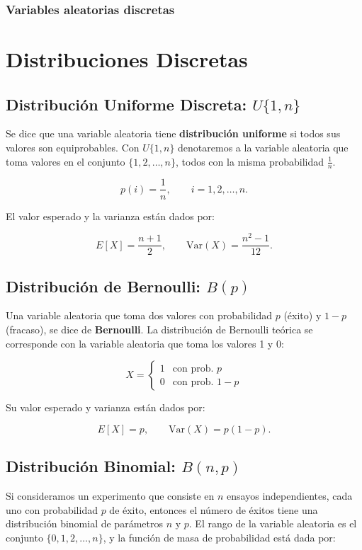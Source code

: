 \documentclass[11pt, a4paper]{article}
\theoremstyle{definition}
\begin{document}
\subsubsection{Variables aleatorias discretas}

\section*{Distribuciones Discretas}

\subsection*{Distribución Uniforme Discreta: $U\{1,n\}$}
Se dice que una variable aleatoria tiene \textbf{distribución uniforme} si todos sus valores son equiprobables. Con $U\{1,n\}$ denotaremos a la variable aleatoria que toma valores en el conjunto $\{1,2,\ldots,n\}$, todos con la misma probabilidad $\frac{1}{n}$.

\[p(i)=\frac{1}{n},\qquad i=1,2,\ldots,n.\]

El valor esperado y la varianza están dados por:

\[E[X]=\frac{n+1}{2},\qquad \text{Var}(X)=\frac{n^{2}-1}{12}.\]

\subsection*{Distribución de Bernoulli: $B(p)$}
Una variable aleatoria que toma dos valores con probabilidad $p$ (éxito) y $1-p$ (fracaso), se dice de \textbf{Bernoulli}. La distribución de Bernoulli teórica se corresponde con la variable aleatoria que toma los valores 1 y 0:

\[X=\begin{cases}
1 & \text{con prob. } p \\
0 & \text{con prob. } 1-p
\end{cases}\]

Su valor esperado y varianza están dados por:

\[E[X]=p,\qquad \text{Var}(X)=p(1-p).\]

\subsection*{Distribución Binomial: $B(n,p)$}
Si consideramos un experimento que consiste en $n$ ensayos independientes, cada uno con probabilidad $p$ de éxito, entonces el número de éxitos tiene una distribución binomial de parámetros $n$ y $p$. El rango de la variable aleatoria es el conjunto $\{0,1,2,\ldots,n\}$, y la función de masa de probabilidad está dada por:
\end{document}
